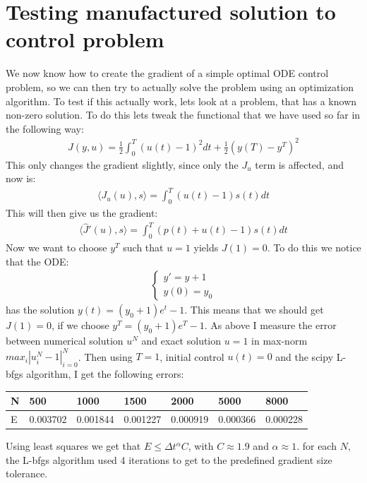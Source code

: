 \documentclass[11pt,a4paper]{article}
\begin{document}
\section*{Testing manufactured solution to control problem}
We now know how to create the gradient of a simple optimal ODE control problem, so we can then try to actually solve the problem using an optimization algorithm. To test if this actually work, lets look at a problem, that has a known non-zero solution. To do this lets tweak the functional that we have used so far in the following way:
\begin{align*}
J(y,u) = \frac{1}{2}\int_0^T(u(t)-1)^2dt + \frac{1}{2}(y(T)-y^T)^2
\end{align*}
This only changes the gradient slightly, since only the $J_u$ term is affected, and now is:
\begin{align*}
\langle J_u(u),s\rangle = \int_0^T (u(t)-1)s(t) dt
\end{align*}
This will then give us the gradient:
\begin{align*}
\langle\hat{J}'(u),s\rangle = \int_0^T(p(t)+u(t)-1)s(t)dt
\end{align*}
Now we want to choose $y^T$ such that $u=1$ yields $J(1)=0$. To do this we notice that the ODE:
\begin{align*}
\left\{
     \begin{array}{lr}
       	y' =  y +1\\
       	   y(0)=y_0
     \end{array}
   \right.
\end{align*}
has the solution $y(t)=(y_0+1)e^t -1$. This means that we should get $J(1)=0$, if we choose $y^T =  (y_0+1)e^T -1$. As above I measure the error between numerical solution $u^N$ and exact solution $u=1$ in max-norm $max_i{|u^N_i-1|}_{i=0}^N$. Then using $T=1$, initial control $u(t)=0$ and the scipy L-bfgs algorithm, I get the following errors:
\begin{center}
    \begin{tabular}{| l | l | l | l | l | l | l |}
    \hline
    N & 500 & 1000  & 1500 & 2000 & 5000 & 8000 \\ \hline
    E & 0.003702 & 0.001844 &0.001227 & 0.000919 & 0.000366 & 0.000228	\\ \hline
    \end{tabular}
\end{center}
Using least squares we get that $E\leq \Delta t^{\alpha}C$, with $C\approx 1.9$ and $\alpha\approx1$. for each $N$, the L-bfgs algorithm used 4 iterations to get to the predefined gradient size tolerance.
\end{document}
